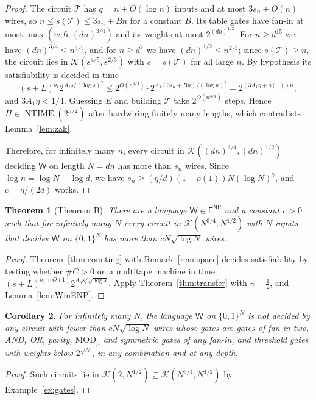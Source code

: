 \documentclass[11pt,reqno]{amsart}
\numberwithin{equation}{section}
\theoremstyle{plain}
\newtheorem{theorem}{Theorem}[section]
\newtheorem{corollary}[theorem]{Corollary}
\theoremstyle{definition}
\theoremstyle{remark}
\DeclareMathOperator{\NTIME}{NTIME}
\newcommand{\cK}{\mathcal{K}}
\newcommand{\ENP}{\mathsf{E}^{\mathsf{NP}}}
\newcommand{\Wl}{\mathsf{W}}
\begin{document}
\begin{proof}
The circuit $\mathcal T$ has $q=n+O(\log n)$ inputs and at most
$3s_n+O(n)$ wires, so $n\le s(\mathcal T)\le3s_n+B n$ for a constant $B$. Its
table gates have fan-in at most $\max(w,6,(dn)^{3/4})$ and its weights at most
$2^{(dn)^{1/2}}$. For $n\ge d^{15}$ we have $(dn)^{3/4}\le n^{4/5}$, and for
$n\ge d^3$ we have $(dn)^{1/2}\le n^{2/3}$; since $s(\mathcal T)\ge n$, the
circuit lies in $\cK(s^{4/5},s^{2/3})$ with $s=s(\mathcal T)$ for all large $n$.
By hypothesis its satisfiability is decided in time
\[
(s+L)^{b_1}2^{A_1s/(\log s)^\gamma}
\le2^{O(n^{3/4})}\cdot2^{A_1(3s_n+Bn)/(\log n)^\gamma}
=2^{(3A_1\eta+o(1))n},
\]
and $3A_1\eta<1/4$. Guessing $E$ and building $\mathcal T$ take
$2^{O(n^{3/4})}$ steps. Hence $H\in\NTIME(2^{n/2})$ after hardwiring finitely
many lengths, which contradicts Lemma~\ref{lem:zak}.

Therefore, for infinitely many $n$, every circuit in
$\cK((dn)^{3/4},(dn)^{1/2})$ deciding $\Wl$ on length $N=dn$ has more than $s_n$
wires. Since $\log n=\log N-\log d$, we have $s_n\ge(\eta/d)(1-o(1))N(\log
N)^\gamma$, and $c=\eta/(2d)$ works.
\end{proof}

\begin{theorem}[Theorem B]\label{thm:lower}
There are a language $\Wl\in\ENP$ and a constant $c>0$ such that for infinitely
many $N$ every circuit in $\cK(N^{3/4},N^{1/2})$ with $N$ inputs that decides
$\Wl$ on $\{0,1\}^N$ has more than $cN\sqrt{\log N}$ wires.
\end{theorem}

\begin{proof}
Theorem~\ref{thm:counting} with Remark~\ref{rem:space} decides satisfiability
by testing whether $\#C>0$ on a multitape machine in time
$(s+L)^{b_0+O(1)}2^{A_0s/\sqrt{\log s}}$. Apply Theorem~\ref{thm:transfer} with
$\gamma=\tfrac12$, and Lemma~\ref{lem:WinENP}.
\end{proof}

\begin{corollary}\label{cor:lowerclasses}
For infinitely many $N$, the language $\Wl$ on $\{0,1\}^N$ is not decided by any
circuit with fewer than $cN\sqrt{\log N}$ wires whose gates are gates of fan-in
two, AND, OR, parity, $\mathrm{MOD}_\mu$ and symmetric gates of any fan-in, and
threshold gates with weights below $2^{\sqrt N}$, in any combination and at any
depth.
\end{corollary}

\begin{proof}
Such circuits lie in $\cK(2,N^{1/2})\subseteq\cK(N^{3/4},N^{1/2})$ by
Example~\ref{ex:gates}.
\end{proof}
\end{document}
